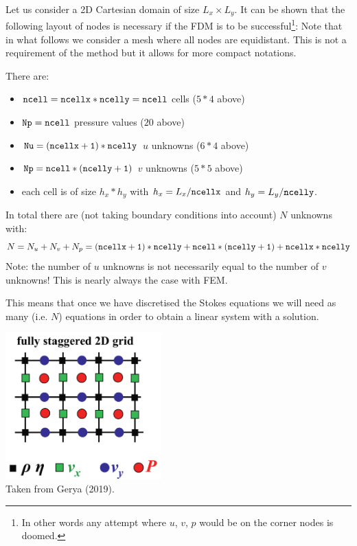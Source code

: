 Let us consider a 2D Cartesian domain of size $L_x \times L_y$.
It can be shown that the following layout of nodes is necessary 
if the FDM is to be successful\footnote{In other words
any attempt where $u$, $v$, $p$ would be on the corner nodes is doomed.}:
Note that in what follows we consider a mesh where all nodes are equidistant.
This is not a requirement of the method but it allows for more compact notations. 



There are:
\begin{itemize}
\item ${\tt ncell}={\tt ncellx}*{\tt ncelly}={\tt ncell}$ cells ($5*4$ above)
\item ${\tt Np}={\tt ncell}$ pressure values ($20$ above)
\item ${\tt Nu}={\tt (ncellx+1)}*{\tt ncelly}$ $u$ unknowns ($6*4$ above) 
\item ${\tt Np}={\tt ncell}*{\tt (ncelly+1)}$ $v$ unknowns ($5*5$ above) 
\item each cell is of size $h_x * h_y$ with $h_x=L_x/{\tt ncellx}$ 
and $h_y=L_y/{\tt ncelly}$.
\end{itemize}
In total there are (not taking boundary conditions into account)
$N$ unknowns with:
\[
N=N_u+N_v+N_p
= {\tt (ncellx+1)}*{\tt ncelly}
+ {\tt ncell}*{\tt (ncelly+1)}
+ {\tt ncellx}*{\tt ncelly} 
\]
Note: the number of $u$ unknowns is not necessarily equal to the number of $v$
unknowns! This is nearly always the case with FEM. 

This means that once we have discretised the Stokes equations we will need
as many (i.e. $N$) equations in order to obtain a linear system with a solution.


\begin{center}
\includegraphics[width=6cm]{images/fdm/gerya_A}\\
{\captionfont Taken from Gerya (2019).}
\end{center}

